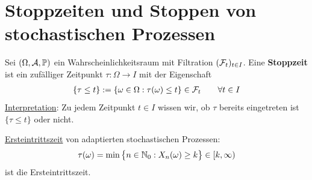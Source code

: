 
\chapter{Stoppzeiten und Stoppen von stochastischen Prozessen} %

\begin{defi}[Stoppzeit]\enter
	Sei $(\Omega,\mathcal{A},\mathbb{P})$ ein Wahrscheinlichkeitsraum mit Filtration $(\mathcal{F}_t)_{t\in I}$.
	Eine \textbf{Stoppzeit} ist ein zufälliger Zeitpunkt $\tau:\Omega\to I$ mit der Eigenschaft
	\begin{align*}
		\lbrace\tau\leq t\rbrace:=\lbrace\omega\in\Omega:\tau(\omega)\leq t\rbrace\in\mathcal{F}_t\qquad\forall t\in I
	\end{align*}
	\ul{Interpretation}: Zu jedem Zeitpunkt $t\in I$ wissen wir, ob $\tau$ bereits eingetreten ist $\lbrace\tau\leq t\rbrace$ oder nicht.
\end{defi}

\begin{beisp}\enter
	\ul{Ersteintrittszeit} von adaptierten stochastischen Prozessen:
	\begin{align*}
		\tau(\omega)=\min\big\lbrace n\in\mathbb{N}_0:X_n(\omega)\geq k\big\rbrace\in[k,\infty)
	\end{align*}
	ist die Ersteintrittszeit.
\end{beisp}


